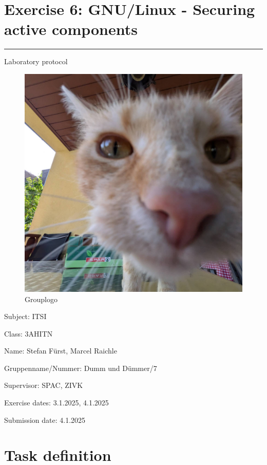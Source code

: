 \documentclass[a4paper]{article}
\begin{document}

\pagestyle{oida}
\section*{Exercise 6: GNU/Linux - Securing active components}
\par\noindent\rule{\textwidth}{0.4pt}

Laboratory protocol
\begin{figure}[h]
	\includegraphics[scale=0.3]{images/mika.jpeg}
	\caption{Grouplogo}
\end{figure}

\vspace*{\fill}
Subject:	ITSI

Class:	3AHITN

Name:	Stefan Fürst, Marcel Raichle

Gruppenname/Nummer: Dumm und Dümmer/7

Supervisor: 	SPAC, ZIVK

Exercise dates:	3.1.2025, 4.1.2025

Submission date: 4.1.2025


\newpage
\tableofcontents

\newpage

\section{Task definition}
\end{document}
